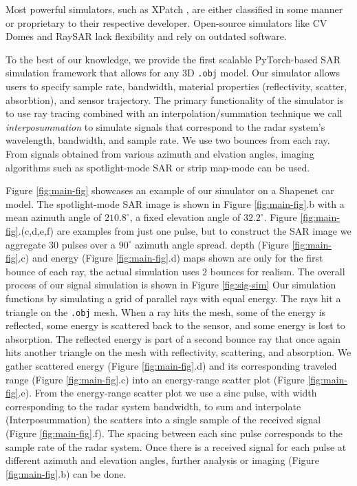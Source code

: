 \documentclass[onecolumn]{IEEEtran}
\begin{document}
Most powerful simulators, such as XPatch \cite{xpatch4}, are either classified in some manner or proprietary to their respective developer. Open-source simulators like CV Domes \cite{cvdomes} and RaySAR \cite{raysar} lack flexibility and rely on outdated software.

To the best of our knowledge, we provide the first scalable PyTorch-based SAR simulation framework that allows for any 3D \texttt{.obj} model. Our simulator allows users to specify sample rate, bandwidth, material properties (reflectivity, scatter, absorbtion), and sensor trajectory.
The primary functionality of the simulator is to use ray tracing combined with an interpolation/summation technique we call \emph{interposummation} to simulate signals that correspond to the radar system's wavelength, bandwidth, and sample rate. We use two bounces from each ray. From signals obtained from various azimuth and elvation angles, imaging algorithms such as spotlight-mode \cite{spotlightmodesar} SAR or strip map-mode can be used.

Figure \ref{fig:main-fig} showcases an example of our simulator on a Shapenet \cite{shapenet} car model. The spotlight-mode SAR image is shown in Figure \ref{fig:main-fig}.b with a mean azimuth angle of $210.8^\circ$, a fixed elevation angle of $32.2^\circ$. Figure \ref{fig:main-fig}.(c,d,e,f) are examples from just one pulse, but to construct the SAR image we aggregate $30$ pulses over a $90^\circ$ azimuth angle spread. depth (Figure \ref{fig:main-fig}.c) and energy (Figure \ref{fig:main-fig}.d) maps shown are only for the first bounce of each ray, the actual simulation uses $2$ bounces for realism.
The overall process of our signal simulation is shown in Figure \ref{fig:sig-sim} Our simulation functions by simulating a grid of parallel rays with equal energy. The rays hit a triangle on the \texttt{.obj} mesh. When a ray hits the mesh, some of the energy is reflected, some energy is scattered back to the sensor, and some energy is lost to absorption. The reflected energy is part of a second bounce ray that once again hits another triangle on the mesh with reflectivity, scattering, and absorption. We gather scattered energy (Figure \ref{fig:main-fig}.d) and its corresponding traveled range (Figure \ref{fig:main-fig}.c) into an energy-range scatter plot (Figure \ref{fig:main-fig}.e). From the energy-range scatter plot we use a sinc pulse, with width corresponding to the radar system bandwidth, to sum and interpolate (Interposummation) the scatters into a single sample of the received signal (Figure \ref{fig:main-fig}.f). The spacing between each sinc pulse corresponds to the sample rate of the radar system. Once there is a received signal for each pulse at different azimuth and elevation angles, further analysis or imaging (Figure \ref{fig:main-fig}.b) can be done.
\end{document}
